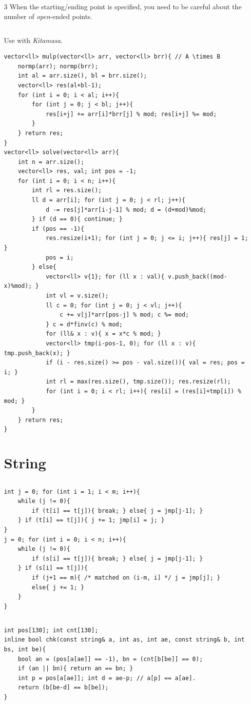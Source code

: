 \documentclass[landscape, 8pt, a4paper, oneside]{extarticle}
\begin{document}
\begin{multicols*}{3}
When the starting/ending point is specified, you need to be careful about the number of \textit{open}-ended points.
\subsection{}
Use with \textit{Kitamasa}.
\begin{verbatim}
vector<ll> mulp(vector<ll> arr, vector<ll> brr){ // A \times B
	normp(arr); normp(brr);
	int al = arr.size(), bl = brr.size();
	vector<ll> res(al+bl-1);
	for (int i = 0; i < al; i++){
		for (int j = 0; j < bl; j++){
			res[i+j] += arr[i]*brr[j] % mod; res[i+j] %= mod;
		}
	} return res;
}
vector<ll> solve(vector<ll> arr){
	int n = arr.size();
	vector<ll> res, val; int pos = -1;
	for (int i = 0; i < n; i++){
		int rl = res.size();
		ll d = arr[i]; for (int j = 0; j < rl; j++){
			d -= res[j]*arr[i-j-1] % mod; d = (d+mod)%mod;
		} if (d == 0){ continue; }
		if (pos == -1){
			res.resize(i+1); for (int j = 0; j <= i; j++){ res[j] = 1; }
			pos = i;
		} else{
			vector<ll> v{1}; for (ll x : val){ v.push_back((mod-x)%mod); }
			int vl = v.size();
			ll c = 0; for (int j = 0; j < vl; j++){
				c += v[j]*arr[pos-j] % mod; c %= mod;
			} c = d*finv(c) % mod;
			for (ll& x : v){ x = x*c % mod; }
			vector<ll> tmp(i-pos-1, 0); for (ll x : v){ tmp.push_back(x); }
			if (i - res.size() >= pos - val.size()){ val = res; pos = i; }
			int rl = max(res.size(), tmp.size()); res.resize(rl); 
			for (int i = 0; i < rl; i++){ res[i] = (res[i]+tmp[i]) % mod; }
		}
	} return res;
}
\end{verbatim}
\section{String}
\subsection{}
\begin{verbatim}
int j = 0; for (int i = 1; i < m; i++){
	while (j != 0){
		if (t[i] == t[j]){ break; } else{ j = jmp[j-1]; }
	} if (t[i] == t[j]){ j += 1; jmp[i] = j; }
}
j = 0; for (int i = 0; i < n; i++){
	while (j != 0){
		if (s[i] == t[j]){ break; } else{ j = jmp[j-1]; } 
	} if (s[i] == t[j]){
		if (j+1 == m){ /* matched on (i-m, i] */ j = jmp[j]; }
		else{ j += 1; }
	}
}
\end{verbatim}
\subsection{}
\begin{verbatim}
int pos[130]; int cnt[130];
inline bool chk(const string& a, int as, int ae, const string& b, int bs, int be){
	bool an = (pos[a[ae]] == -1), bn = (cnt[b[be]] == 0);
	if (an || bn){ return an == bn; }
	int p = pos[a[ae]]; int d = ae-p; // a[p] == a[ae].
	return (b[be-d] == b[be]);
}


\end{verbatim}
\end{multicols*}
\end{document}

